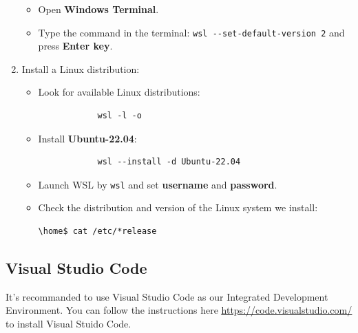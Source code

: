 \begin{enumerate}
\begin{itemize}
        \item Open {\bf Windows Terminal}.
        \item Type the command in the terminal: \verb+wsl --set-default-version 2+ and press {\bf Enter key}.
    \end{itemize}
    \item Install a Linux distribution:
    \begin{itemize}
        \item Look for available Linux distributions:
        \begin{verbatim}
            wsl -l -o
        \end{verbatim}
        \item Install {\bf Ubuntu-22.04}:
        \begin{verbatim}
            wsl --install -d Ubuntu-22.04
        \end{verbatim}
        \item Launch WSL by \verb+wsl+ and set {\bf username} and {\bf password}.
        \item Check the distribution and version of the Linux system we install:
        \begin{Verbatim}[commandchars=\\\{\}]
            \home$ cat /etc/*release
        \end{Verbatim}
    \end{itemize}
\end{enumerate}
\newpage

\subsection{Visual Studio Code}
It's recommanded to use Visual Studio Code as our Integrated Development Environment. You can follow the instructions here \href{https://code.visualstudio.com/}{\color{blue}\underline{https://code.visualstudio.com/}} to install Visual Stuido Code.

